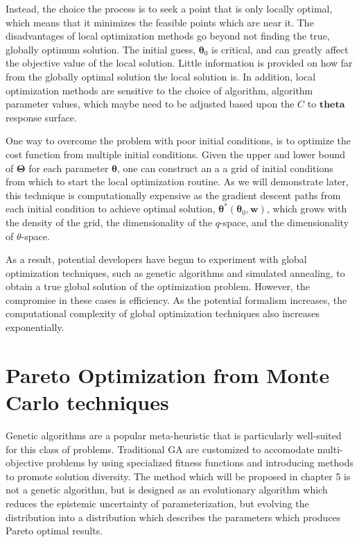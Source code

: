 Instead, the choice the process is to seek a point that is only locally optimal, which means that it minimizes the feasible points which are near it.  The disadvantages of local optimization methods go beyond not finding the true, globally optimum solution.  The initial guess, $\bm{\theta}_0$ is critical, and can greatly affect the objective value of the local solution.  Little information is provided on how far from the globally optimal solution the local solution is.  In addition, local optimization methods are sensitive to the choice of algorithm, algorithm parameter values, which maybe need to be adjusted based upon the $C$ to $\bm{theta}$ response surface.

One way to overcome the problem with poor initial conditions, is to optimize the cost function from multiple initial conditions.  Given the upper and lower bound of $\bm{\Theta}$ for each parameter $\bm{\theta}$, one can construct an a a grid of initial conditions from which to start the local optimization routine.  As we will demonstrate later, this technique is computationally expensive as the gradient descent paths from each initial condition to achieve optimal solution, $\bm{\theta}^*(\bm{\theta}_0,\bm{w})$, which grows with the density of the grid, the dimensionality of the $q$-space, and the dimensionality of $\theta$-space.

As a result, potential developers have begun to experiment with global optimization techniques, such as genetic algorithms and simulated annealing\cite{martinez2013_fitting,martinez2016_posmat}, to obtain a true global solution of the optimization problem.  However, the compromise in these cases is efficiency.  As the potential formalism increases, the computational complexity of global optimization techniques also increases exponentially.

\section{Pareto Optimization from Monte Carlo techniques}

Genetic algorithms are a popular meta-heuristic that is particularly well-suited for this class of problems.  Traditional GA are customized to accomodate multi-objective problems by using specialized fitness functions and introducing methods to promote solution diversity.  The method which will be proposed in chapter 5 is not a genetic algorithm, but is designed as an evolutionary algorithm which reduces the epistemic uncertainty of parameterization, but evolving the distribution into a distribution  which describes the parameters which produces Pareto optimal results.

